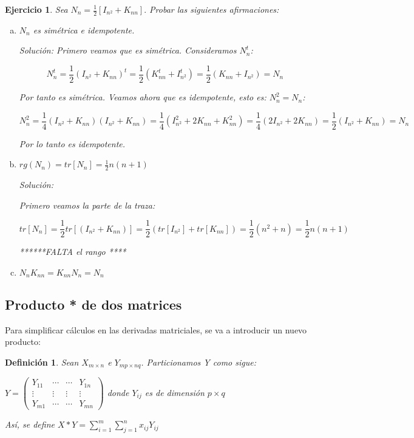 \documentclass{article}
\theoremstyle{theorem-style}  %
\theoremstyle{definition-style}
\newtheorem{definition}{Definición}[section]
\theoremstyle{example-style}
\theoremstyle{exercise-style}
\newtheorem{exercise}{Ejercicio}[section]
\begin{document}
	

	\begin{exercise}
		Sea $N_n = \frac{1}{2}[I_{n^2}+K_{nn}].$ Probar las siguientes afirmaciones:
		\begin{enumerate}[a)]
			\item $N_n$ es simétrica e idempotente.
			
			\textit{Solución:}
			Primero veamos que es simétrica. Consideramos $N_n^t$:
			
			$$N_n^t = \frac{1}{2}(I_{n^2}+K_{nn})^t = \frac{1}{2}(K_{nn}^t + I_{n^2}^t) = \frac{1}{2}(K_{nn} + I_{n^2}) = N_n$$
			
			Por tanto es simétrica. Veamos ahora que es idempotente, esto es: $N_n^2 = N_n$:
			
			$$ N_n^2=\frac{1}{4}(I_{n^2} + K_{nn})(I_{n^2} + K_{nn}) = \frac{1}{4}(I_{n^2}^2 + 2K_{nn} +  K_{nn}^2) = \frac{1}{4}(2I_{n^2} + 2K_{nn}) = \frac{1}{2}(I_{n^2} + K_{nn}) = N_n $$ 
			
			Por lo tanto es idempotente.
			
			\item $rg(N_n) = tr[N_n] = \frac{1}{2}n(n+1)$
			
			\textit{Solución:}
			
			Primero veamos la parte de la traza:
			
			$$tr[N_n] = \frac{1}{2}tr[(I_{n^2} + K_{nn})] = \frac{1}{2}(tr[I_{n^2}]+tr[K_{nn}]) = \frac{1}{2}(n^2 + n) = \frac{1}{2}n(n+1)$$
			
			******FALTA el rango ****
			
			\item $N_nK_{nn} = K_{nn}N_n = N_n$
		\end{enumerate}
	\end{exercise}
	
	\newpage
	
	\subsection{Producto * de dos matrices}
	Para simplificar cálculos en las derivadas matriciales, se va a introducir un nuevo producto: 
	
	\begin{definition}
		Sean $X_{m \times n}$ e $Y_{mp \times nq} $. Particionamos Y como sigue:
		
		$Y=\left( \begin{matrix}
		Y_{11} & \cdots & \cdots & Y_{1n}\\
		\vdots & \vdots & \vdots & \vdots \\
		Y_{m1} & \cdots & \cdots & Y_{mn} \end{matrix} \right)$ donde $Y_{ij}$ es de dimensión $p \times q$
		
		Así, se define $X*Y = \sum_{i=1}^{m}\sum_{j=1}^{n} x_{ij}Y_{ij}$ 
		
	\end{definition}
	
\end{document}
